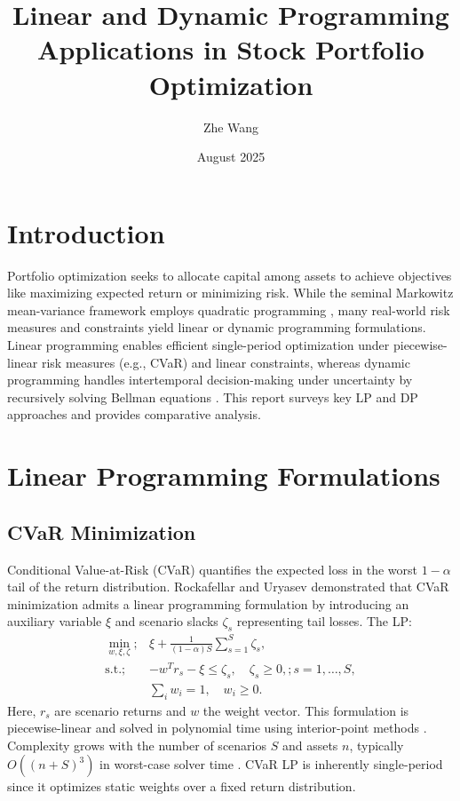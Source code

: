 \documentclass{article}
\title{Linear and Dynamic Programming Applications in Stock Portfolio Optimization}
\author{Zhe Wang}
\date{August 2025}
\begin{document}
\maketitle

\section{Introduction}
Portfolio optimization seeks to allocate capital among assets to achieve objectives like maximizing expected return or minimizing risk. While the seminal Markowitz mean-variance framework employs quadratic programming \cite{markowitz1952}, many real-world risk measures and constraints yield linear or dynamic programming formulations. Linear programming enables efficient single-period optimization under piecewise-linear risk measures (e.g., CVaR) and linear constraints, whereas dynamic programming handles intertemporal decision-making under uncertainty by recursively solving Bellman equations \cite{bellman1957}. This report surveys key LP and DP approaches and provides comparative analysis.

\section{Linear Programming Formulations}

\subsection{CVaR Minimization}
Conditional Value-at-Risk (CVaR) quantifies the expected loss in the worst $1-\alpha$ tail of the return distribution. Rockafellar and Uryasev \cite{rockafellar2000} demonstrated that CVaR minimization admits a linear programming formulation by introducing an auxiliary variable $\xi$ and scenario slacks $\zeta_s$ representing tail losses. The LP:
\begin{align*}
\min_{w,\xi,\zeta} ; & \xi + \frac{1}{(1-\alpha)S} \sum_{s=1}^S \zeta_s, \\
\text{s.t.} ; & -w^T r_s - \xi \le \zeta_s, \quad \zeta_s \ge 0, ; s=1,\dots,S, \\
& \sum_i w_i = 1, \quad w_i \ge 0.
\end{align*}
Here, $r_s$ are scenario returns and $w$ the weight vector. This formulation is piecewise-linear and solved in polynomial time using interior-point methods \cite{nemhauser1988}. Complexity grows with the number of scenarios $S$ and assets $n$, typically $O((n+S)^{3})$ in worst-case solver time \cite{wright1997}. CVaR LP is inherently single-period since it optimizes static weights over a fixed return distribution.
\end{document}
